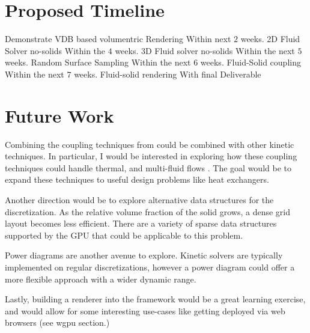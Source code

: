 \documentclass{article}
\begin{document}
\section{Proposed Timeline}

\begin{outline}
  \1 Demonstrate VDB based volumentric Rendering
    \2 Within next $2$ weeks.
  \1 2D Fluid Solver no-solids
    \2 Within the $4$ weeks. 
  \1 3D Fluid solver no-solids
    \2 Within the next $5$ weeks.
  \1 Random Surface Sampling
    \2 Within the next $6$ weeks.
  \1 Fluid-Solid coupling
    \2 Within the next $7$ weeks.
  \1 Fluid-solid rendering
    \2 With final Deliverable
\end{outline}

\section{Future Work}

Combining the coupling techniques from \cite{Lyu2021} could be combined with other kinetic techniques.
In particular, I would be interested in exploring how these coupling techniques could handle thermal,
and multi-fluid flows \cite{Li2024}.
The goal would be to expand these techniques to useful design problems like heat exchangers.

Another direction would be to explore alternative data structures for the discretization.
As the relative volume fraction of the solid grows, a dense grid layout becomes less efficient.
There are a variety of sparse data structures supported by the GPU that could be applicable to this problem.

Power diagrams are another avenue to explore. 
Kinetic solvers are typically implemented on regular discretizations,
however a power diagram could offer a more flexible approach with a wider dynamic range.

Lastly, building a renderer into the framework would be a great learning exercise, and would
allow for some interesting use-cases like getting deployed via web browsers (see wgpu section.)

\printbibliography
\end{document}
